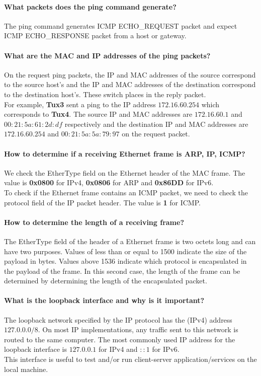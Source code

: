 \documentclass[11pt]{report}
\newcommand{\tux}[1]{\textbf{Tux#1}}
\begin{document}
\paragraph{What packets does the ping command generate?}
The ping command generates ICMP ECHO\_REQUEST packet and expect
ICMP ECHO\_RESPONSE packet from a host or gateway.

\paragraph{What are the MAC and IP addresses of the ping packets?}
On the request ping packets, the IP and MAC addresses of the source correspond
to the source host's and the IP and MAC addresses of the destination correspond
to the destination host's. These switch places in the reply packet.\\
For example, \tux{3} sent a ping to the IP address $172.16.60.254$
which corresponds to \tux{4}. The source IP and MAC addresses are
$172.16.60.1$ and $00:21:5a:61:2d:df$ respectively and the destination
IP and MAC addresses are $172.16.60.254$ and $00:21:5a:5a:79:97$
on the request packet.

\paragraph{How to determine if a receiving Ethernet frame is ARP, IP, ICMP?}
We check the EtherType field on the Ethernet header of the MAC frame. The value is
\textbf{0x0800} for IPv4, \textbf{0x0806} for ARP and \textbf{0x86DD} for IPv6.\\
To check if the Ethernet frame contains an ICMP packet, we need to check the
protocol field of the IP packet header. The value is \textbf{1} for ICMP.

\paragraph{How to determine the length of a receiving frame?}
The EtherType field of the header of a Ethernet frame is two octets long and can
have two purposes. Values of less than or equal to 1500 indicate the size of the
payload in bytes. Values above 1536 indicate which protocol is encapsulated in
the payload of the frame. In this second case, the length of the frame can be
determined by determining the length of the encapsulated packet.

\paragraph{What is the loopback interface and why is it important?}
The loopback network specified by the IP protocol has the (IPv4) address
$127.0.0.0/8$. On most IP implementations, any traffic sent to this network
is routed to the same computer. The most commonly used IP address for the
loopback interface is $127.0.0.1$ for IPv4 and $::1$ for IPv6.\\
This interface is useful to test and/or run client-server application/services
on the local machine.
\end{document}

